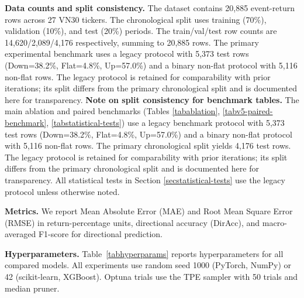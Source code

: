 \documentclass[runningheads]{llncs}
\begin{document}
\textbf{Data counts and split consistency.}
The dataset contains 20,885 event-return rows across 27 VN30 tickers. The chronological split uses training (70\%), validation (10\%), and test (20\%) periods. The train/val/test row counts are 14,620/2,089/4,176 respectively, summing to 20,885 rows. The primary experimental benchmark uses a legacy protocol with 5,373 test rows (Down=38.2\%, Flat=4.8\%, Up=57.0\%) and a binary non-flat protocol with 5,116 non-flat rows. The legacy protocol is retained for comparability with prior iterations; its split differs from the primary chronological split and is documented here for transparency.
\textbf{Note on split consistency for benchmark tables.}
The main ablation and paired benchmarks (Tables \ref{tabablation}, \ref{tabv5-paired-benchmark}, \ref{tabstatistical-tests}) use a legacy benchmark protocol with 5,373 test rows (Down=38.2\%, Flat=4.8\%, Up=57.0\%) and a binary non-flat protocol with 5,116 non-flat rows. The primary chronological split yields 4,176 test rows. The legacy protocol is retained for comparability with prior iterations; its split differs from the primary chronological split and is documented here for transparency. All statistical tests in Section \ref{secstatistical-tests} use the legacy protocol unless otherwise noted.

\textbf{Metrics.}
We report Mean Absolute Error (MAE) and Root Mean Square Error (RMSE) in return-percentage units, directional accuracy (DirAcc), and macro-averaged F1-score for directional prediction.

\textbf{Hyperparameters.}
\label{sechyperparams}
Table~\ref{tabhyperparams} reports hyperparameters for all compared models. All experiments use random seed 1000 (PyTorch, NumPy) or 42 (scikit-learn, XGBoost). Optuna trials use the TPE sampler with 50 trials and median pruner.
\end{document}
